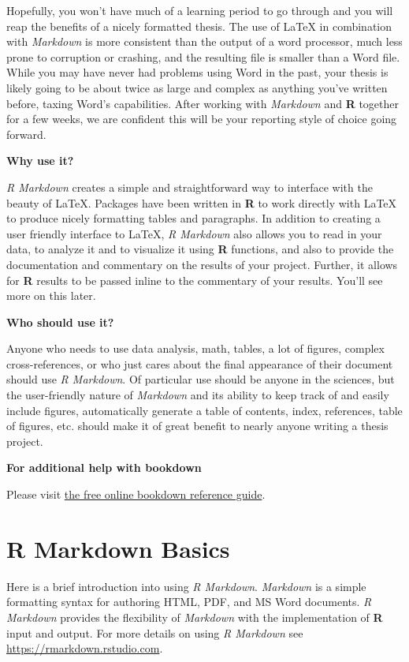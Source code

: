 \documentclass[12pt,twoside]{reedthesis}
\begin{document}
Hopefully, you won't have much of a learning period to go through and you will reap the benefits of a nicely formatted thesis. The use of LaTeX in combination with \emph{Markdown} is more consistent than the output of a word processor, much less prone to corruption or crashing, and the resulting file is smaller than a Word file. While you may have never had problems using Word in the past, your thesis is likely going to be about twice as large and complex as anything you've written before, taxing Word's capabilities. After working with \emph{Markdown} and \textbf{R} together for a few weeks, we are confident this will be your reporting style of choice going forward.

\textbf{Why use it?}

\emph{R Markdown} creates a simple and straightforward way to interface with the beauty of LaTeX. Packages have been written in \textbf{R} to work directly with LaTeX to produce nicely formatting tables and paragraphs. In addition to creating a user friendly interface to LaTeX, \emph{R Markdown} also allows you to read in your data, to analyze it and to visualize it using \textbf{R} functions, and also to provide the documentation and commentary on the results of your project. Further, it allows for \textbf{R} results to be passed inline to the commentary of your results. You'll see more on this later.

\textbf{Who should use it?}

Anyone who needs to use data analysis, math, tables, a lot of figures, complex cross-references, or who just cares about the final appearance of their document should use \emph{R Markdown}. Of particular use should be anyone in the sciences, but the user-friendly nature of \emph{Markdown} and its ability to keep track of and easily include figures, automatically generate a table of contents, index, references, table of figures, etc. should make it of great benefit to nearly anyone writing a thesis project.

\textbf{For additional help with bookdown}

Please visit \href{https://bookdown.org/yihui/bookdown/}{the free online bookdown reference guide}.

\hypertarget{rmd-basics}{%
\chapter{R Markdown Basics}\label{rmd-basics}}

Here is a brief introduction into using \emph{R Markdown}. \emph{Markdown} is a simple formatting syntax for authoring HTML, PDF, and MS Word documents. \emph{R Markdown} provides the flexibility of \emph{Markdown} with the implementation of \textbf{R} input and output. For more details on using \emph{R Markdown} see \url{https://rmarkdown.rstudio.com}.
\end{document}
